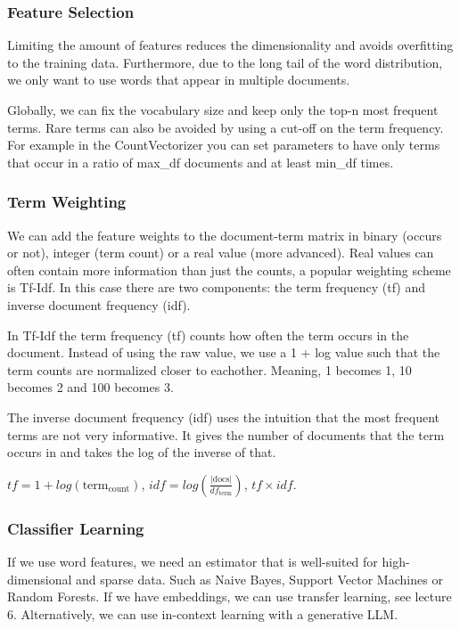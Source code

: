 \subsubsection{Feature Selection}

Limiting the amount of features reduces the dimensionality and
avoids overfitting to the training data. Furthermore, due to the
long tail of the word distribution, we only want to use words that
appear in multiple documents.

Globally, we can fix the vocabulary size and keep only the top-n most
frequent terms. Rare terms can also be avoided by using a cut-off on
the term frequency. For example in the CountVectorizer you can set parameters
to have only terms that occur in a ratio of max\_df documents and at least
min\_df times.

\subsubsection{Term Weighting}

We can add the feature weights to the document-term matrix in binary
(occurs or not),
integer (term count) or a real value (more advanced). Real values can
often contain
more information than just the counts, a popular weighting scheme is
Tf-Idf. In this case
there are two components: the term frequency (tf) and inverse
document frequency (idf).

In Tf-Idf the term frequency (tf) counts how often the term occurs in
the document.
Instead of using the raw value, we use a 1 + log value such that the
term counts are
normalized closer to eachother. Meaning, 1 becomes 1, 10 becomes 2
and 100 becomes 3.

The inverse document frequency (idf) uses the intuition that the most
frequent terms
are not very informative. It gives the number of documents that the
term occurs in and
takes the log of the inverse of that.

\begin{definition}[Tf-Idf]
  $tf = 1 + log(\text{term}_\text{count})$, $idf =
  log(\frac{|\text{docs}|}{df_\text{term}})$, $tf \times idf$.
\end{definition}

\subsubsection{Classifier Learning}

If we use word features, we need an estimator that is well-suited for
high-dimensional and sparse data. Such as Naive Bayes, Support Vector Machines
or Random Forests. If we have embeddings, we can use transfer learning,
see lecture 6. Alternatively, we can use in-context learning with a
generative LLM.

